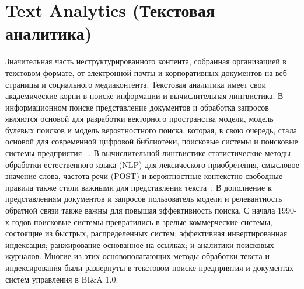 \section{Text Analytics (Текстовая аналитика)}

Значительная часть неструктурированного контента, собранная
организацией в текстовом формате, от электронной почты
и корпоративных документов на веб-страницы и социального
медиаконтента. Текстовая аналитика имеет свои академические корни в поиске информации и вычислительная лингвистика. В информационном
поиске представление документов и обработка запросов
являются основой для разработки векторного пространства
модели, модель булевых поисков и модель вероятностного поиска, которая, в свою очередь, стала основой для современной цифровой
библиотеки, поисковые системы и поисковые системы предприятия
~\cite{Salton:1989}. В вычислительной лингвистике статистические 
методы обработки естественного языка (NLP) для лексического приобретения,
смысловое значение слова, частота речи (POST)
и вероятностные контекстно-свободные правила также стали
важными для представления текста~\cite{Manning:1999}.
В дополнение к представлениям документов и запросов пользователь
модели и релевантность обратной связи также важны для
повышая эффективность поиска.
С начала 1990-х годов поисковые системы превратились в
зрелые коммерческие системы, состоящие из быстрых, распределенных
систем; эффективная инвертированная индексация; ранжирование основанное на ссылках; и аналитики поисковых журналов. Многие из этих основополагающих
методы обработки текста и индексирования были
развернуты в текстовом поиске предприятия и документах
систем управления в BI\&A 1.0.

